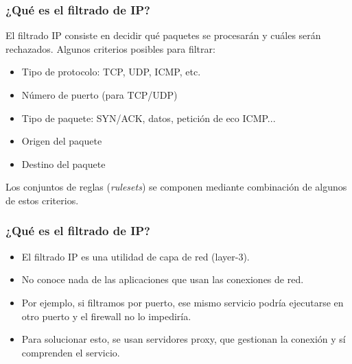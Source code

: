 \documentclass{beamer}
\begin{document}
\begin{frame}
\frametitle{¿Qué es el filtrado de IP?}

El filtrado IP consiste en decidir qué paquetes se procesarán y cuáles serán rechazados. Algunos criterios posibles para filtrar:

\begin{itemize}
\item Tipo de protocolo: TCP, UDP, ICMP, etc.
\item Número de puerto (para TCP/UDP)
\item Tipo de paquete: SYN/ACK, datos, petición de eco ICMP...
\item Origen del paquete
\item Destino del paquete
\end{itemize}

Los conjuntos de reglas (\textit{rulesets}) se componen mediante combinación de algunos de estos criterios.

\end{frame}


\begin{frame}
\frametitle{¿Qué es el filtrado de IP?}

\begin{itemize}
\item El filtrado IP es una utilidad de capa de red (layer-3).
\item No conoce nada de las aplicaciones que usan las conexiones de red.
\item Por ejemplo, si filtramos por puerto, ese mismo servicio podría ejecutarse en otro puerto y el firewall no lo impediría.
\item Para solucionar esto, se usan \alert{servidores proxy}, que gestionan la conexión y sí comprenden el servicio.
\end{itemize}

\end{frame}

\end{document}
